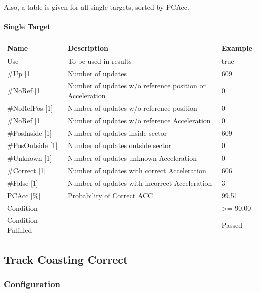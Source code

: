 Also, a table is given for all single targets, sorted by PCAcc.

\paragraph{Single Target}

\begin{center}
 \begin{table}[H]
  \begin{tabularx}{\textwidth}{ | l | X |  l | }
    \hline
    \textbf{Name} & \textbf{Description} & \textbf{Example} \\ \hline
    Use & To be used in results & true \\ \hline
    \#Up [1] & Number of updates & 609 \\ \hline
    \#NoRef [1] & Number of updates w/o reference position or Acceleration & 0 \\ \hline
    \#NoRefPos [1] & Number of updates w/o reference position  & 0 \\ \hline
    \#NoRef [1] & Number of updates w/o reference Acceleration & 0 \\ \hline
    \#PosInside [1] & Number of updates inside sector & 609 \\ \hline
    \#PosOutside [1] & Number of updates outside sector & 0 \\ \hline
    \#Unknown [1] & Number of updates unknown Acceleration & 0 \\ \hline
    \#Correct [1] & Number of updates with correct Acceleration & 606 \\ \hline
    \#False [1] & Number of updates with incorrect Acceleration & 3 \\ \hline
    PCAcc [\%] & Probability of Correct ACC & 99.51 \\ \hline
    Condition &  & >= 90.00 \\ \hline
    Condition Fulfilled &  & Passed \\ \hline
\end{tabularx}
\end{table}
\end{center}

\subsection{Track Coasting Correct}
\label{sec:eval_req_trk_coast_correct} 

\subsubsection{Configuration}

